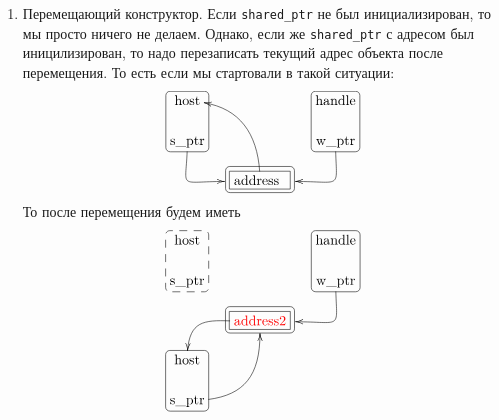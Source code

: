 \begin{enumerate}
\item Перемещающий конструктор.
Если \verb"shared_ptr" не был инициализирован, то мы просто ничего не делаем.
Однако, если же \verb"shared_ptr" с адресом был иницилизирован, то надо перезаписать текущий адрес объекта после перемещения.
То есть если мы стартовали в такой ситуации:
\[
\xymatrix@R=15pt@C=15pt{
  {\text{host}}
  	{
	\save
   [].[d]*[F-:<3pt>]\frm{}
   \restore
	}
  &{}&{\text{handle}}
    	{
	\save
   [].[d]*[F-:<3pt>]\frm{}
   \restore
	}
  \\ 
  {\text{s\_ptr}}\ar@(d,l)[dr]+(-9,0)&{\phantom{address}}&{\text{w\_ptr}}\ar@(d,r)[dl]+(9,0)\\
  {}&{\text{address\phantom{2}}}\ar@(u,r)[uul]
      	{
	\save
   [].[]*[F-]\frm{}
   \restore
	}
    	{
	\save
   [].[]*+[F-:<3pt>]\frm{}
   \restore
	}
  &{}\\
}
\]
То после перемещения будем иметь
\[
\xymatrix@R=15pt@C=15pt{
  {\text{host}}
  	{
	\save
   [].[d]*[F--:<3pt>]\frm{}
   \restore
	}
  &{}&{\text{handle}}
    	{
	\save
   [].[d]*[F-:<3pt>]\frm{}
   \restore
	}
  \\ 
  {\text{s\_ptr}}&{\phantom{address}}&{\text{w\_ptr}}\ar@(d,r)[dl]+(9,0)\\
  {}&{\text{\color{red}address2}}\ar@(l,u)[ld]
      	{
	\save
   [].[]*[F-]\frm{}
   \restore
	}
    	{
	\save
   [].[]*+[F-:<3pt>]\frm{}
   \restore
	}
  &{}\\
  {\text{host}}
  {
	\save
   [].[d]*[F-:<3pt>]\frm{}
   \restore
	}
  &{}&{}\\
  {\text{s\_ptr}}\ar@(r,d)[uur]-(0,3)&{}&{}\\
}
\]



\end{enumerate}
